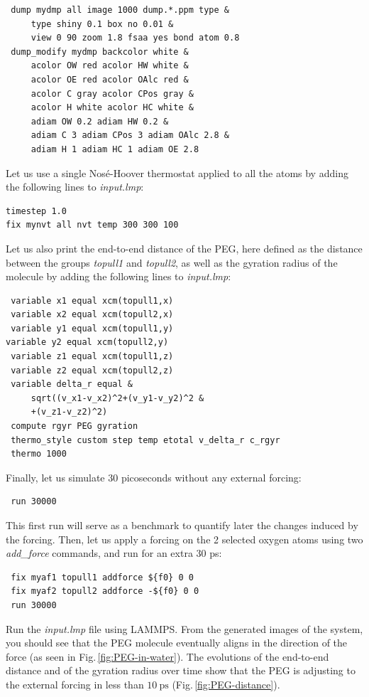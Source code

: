 \documentclass[9pt,tutorial]{livecoms}
\begin{document}
\begin{lstlisting}
 dump mydmp all image 1000 dump.*.ppm type &
     type shiny 0.1 box no 0.01 &
     view 0 90 zoom 1.8 fsaa yes bond atom 0.8
 dump_modify mydmp backcolor white &
     acolor OW red acolor HW white &
     acolor OE red acolor OAlc red &
     acolor C gray acolor CPos gray &
     acolor H white acolor HC white &
     adiam OW 0.2 adiam HW 0.2 &
     adiam C 3 adiam CPos 3 adiam OAlc 2.8 &
     adiam H 1 adiam HC 1 adiam OE 2.8
\end{lstlisting}
Let us use a single Nosé-Hoover thermostat applied to all the atoms by adding the
following lines to \textit{input.lmp}:
\begin{lstlisting}
timestep 1.0
fix mynvt all nvt temp 300 300 100
\end{lstlisting}
Let us also print the end-to-end distance of the PEG,
here defined as the distance between the groups \textit{topull1}
and \textit{topull2}, as well as the gyration
radius of the molecule \cite{fixmanRadiusGyrationPolymer1962a}
by adding the following lines to \textit{input.lmp}:
\begin{lstlisting}
 variable x1 equal xcm(topull1,x)
 variable x2 equal xcm(topull2,x)
 variable y1 equal xcm(topull1,y)
variable y2 equal xcm(topull2,y)
 variable z1 equal xcm(topull1,z)
 variable z2 equal xcm(topull2,z)
 variable delta_r equal &
     sqrt((v_x1-v_x2)^2+(v_y1-v_y2)^2 &
     +(v_z1-v_z2)^2)
 compute rgyr PEG gyration
 thermo_style custom step temp etotal v_delta_r c_rgyr
 thermo 1000
\end{lstlisting}
Finally, let us simulate 30 picoseconds without any external forcing:
\begin{lstlisting}
 run 30000
\end{lstlisting}
This first run will serve as a benchmark to quantify later the changes induced
by the forcing. Then, let us apply a forcing on the 2 selected oxygen atoms using two
\textit{add\_force} commands, and run for an extra 30 ps:
\begin{lstlisting}
 fix myaf1 topull1 addforce ${f0} 0 0
 fix myaf2 topull2 addforce -${f0} 0 0
 run 30000
\end{lstlisting}
Run the \textit{input.lmp} file using LAMMPS. From the generated images of the system,
you should see that the PEG molecule eventually aligns
in the direction of the force (as seen in Fig.\,\ref{fig:PEG-in-water}).
The evolutions of the end-to-end distance and of the gyration radius over
time show that the PEG is adjusting to the external forcing in less than
$10~\text{ps}$ (Fig.\,\ref{fig:PEG-distance}).
\end{document}
